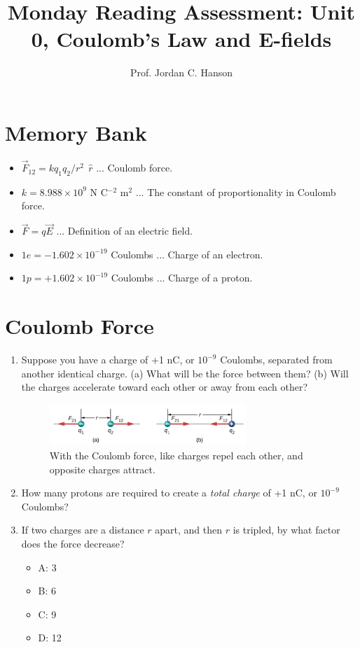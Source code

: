 \documentclass{article}
\begin{document}
\title{Monday Reading Assessment: Unit 0, Coulomb's Law and E-fields}
\author{Prof. Jordan C. Hanson}

\maketitle

\section{Memory Bank}

\begin{itemize}
\item $\vec{F}_{12} = k q_1 q_2 / r^2 ~~\hat{r}$ ... Coulomb force.
\item $k = 8.988 \times 10^{9}$ N C$^{-2}$ m$^{2}$ ... The constant of proportionality in Coulomb force.
\item $\vec{F} = q\vec{E}$ ... Definition of an electric field.
\item $1e = -1.602 \times 10^{-19}$ Coulombs ... Charge of an electron.
\item $1p = +1.602 \times 10^{-19}$ Coulombs ... Charge of a proton.
\end{itemize}

\section{Coulomb Force}

\begin{enumerate}
\item Suppose you have a charge of +1 nC, or $10^{-9}$ Coulombs, separated from another identical charge.  (a) What will be the force between them? (b) Will the charges accelerate toward each other or away from each other? \\ \vspace{2cm}
\begin{figure}[ht]
\centering
\includegraphics[width=0.7\textwidth]{Coul.png}
\caption{\label{fig:coul} With the Coulomb force, like charges repel each other, and opposite charges attract.}
\end{figure}
\item How many protons are required to create a \textit{total charge} of +1 nC, or $10^{-9}$ Coulombs? \\ \vspace{1cm}
\item If two charges are a distance $r$ apart, and then $r$ is tripled, by what factor does the force decrease?
\begin{itemize}
\item A: 3
\item B: 6
\item C: 9
\item D: 12
\end{itemize}
\end{enumerate}
\end{document}
